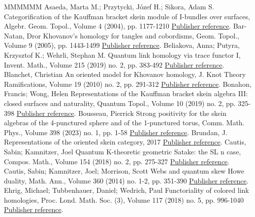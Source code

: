\documentclass[11pt]{article}
\theoremstyle{definition}
\numberwithin{equation}{section}
\begin{document}
\begin{thebibliography}{MMMMMM}
 Asaeda, Marta M.; Przytycki, Józef H.; Sikora, Adam S. Categorification of the Kauffman bracket skein module of I-bundles over surfaces, Algebr. Geom. Topol., Volume 4 (2004), pp. 1177-1210 \href{https://alco.centre-mersenne.org/articles/10.5802/alco.330/#APS}{Publisher reference}.
 Bar-Natan, Dror Khovanov’s homology for tangles and cobordisms, Geom. Topol., Volume 9 (2005), pp. 1443-1499 \href{https://alco.centre-mersenne.org/articles/10.5802/alco.330/#BN2}{Publisher reference}.
 Beliakova, Anna; Putyra, Krzysztof K.; Wehrli, Stephan M. Quantum link homology via trace functor I, Invent. Math., Volume 215 (2019) no. 2, pp. 383-492 \href{https://alco.centre-mersenne.org/articles/10.5802/alco.330/#BPW}{Publisher reference}.
 Blanchet, Christian An oriented model for Khovanov homology, J. Knot Theory Ramifications, Volume 19 (2010) no. 2, pp. 291-312 \href{https://alco.centre-mersenne.org/articles/10.5802/alco.330/#Blan}{Publisher reference}.
 Bonahon, Francis; Wong, Helen Representations of the Kauffman bracket skein algebra III: closed surfaces and naturality, Quantum Topol., Volume 10 (2019) no. 2, pp. 325-398 \href{https://alco.centre-mersenne.org/articles/10.5802/alco.330/#BW1}{Publisher reference}.
 Bousseau, Pierrick Strong positivity for the skein algebras of the 4-punctured sphere and of the 1-punctured torus, Comm. Math. Phys., Volume 398 (2023) no. 1, pp. 1-58 \href{https://alco.centre-mersenne.org/articles/10.5802/alco.330/#Bou}{Publisher reference}.
 Brundan, J. Representations of the oriented skein category, 2017 \href{https://alco.centre-mersenne.org/articles/10.5802/alco.330/#Bru}{Publisher reference}.
 Cautis, Sabin; Kamnitzer, Joel Quantum K-theoretic geometric Satake: the  SL  n  case, Compos. Math., Volume 154 (2018) no. 2, pp. 275-327 \href{https://alco.centre-mersenne.org/articles/10.5802/alco.330/#CK_ann}{Publisher reference}.
 Cautis, Sabin; Kamnitzer, Joel; Morrison, Scott Webs and quantum skew Howe duality, Math. Ann., Volume 360 (2014) no. 1-2, pp. 351-390 \href{https://alco.centre-mersenne.org/articles/10.5802/alco.330/#CKM}{Publisher reference}.
 Ehrig, Michael; Tubbenhauer, Daniel; Wedrich, Paul Functoriality of colored link homologies, Proc. Lond. Math. Soc. (3), Volume 117 (2018) no. 5, pp. 996-1040 \href{https://alco.centre-mersenne.org/articles/10.5802/alco.330/#ETW}{Publisher reference}.

\end{thebibliography}
\end{document}
